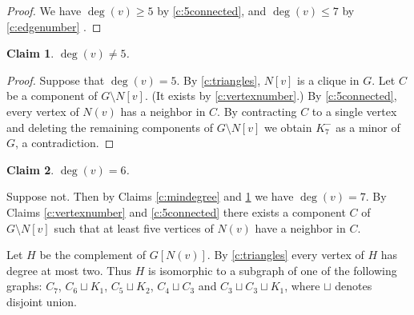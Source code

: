 \documentclass[reqno,final,12pt]{amsart}
\newtheorem{claim}{Claim}[section]
\begin{document}
{\begin{proof}
We have	$\deg(v) \geq 5$ by \cref{c:5connected}, and $\deg(v) \leq 7$ by \cref{c:edgenumber} .
\end{proof}

 \begin{claim}\label{c:degree5}  $ \deg(v) \neq 5$.  
 \end{claim}	
 
\begin{proof}	
 Suppose that $\deg(v)=5$.
 By \cref{c:triangles},  $N[v]$ is a clique in $G$. Let $C$ be a component of $G \setminus N[v]$.  (It exists by \cref{c:vertexnumber}.)	 By \cref{c:5connected}, every vertex of $N(v)$ has a neighbor in $C$. By contracting $C$ to a single vertex and deleting the remaining components of  $G \setminus N[v]$ we obtain $K^-_7$ as a minor of $G$, a contradiction.
\end{proof}	

\begin{claim}\label{c:degree6}  $ \deg(v) = 6$.  
\end{claim}	


 Suppose not. Then by Claims \ref{c:mindegree} and \ref{c:degree5} we have $\deg(v)=7$. By Claims  \ref{c:vertexnumber} and \ref{c:5connected} there exists a component $C$ of $G \setminus N[v]$ such that at least five vertices of $N(v)$ have a neighbor in $C$.
 
 Let $H$ be the complement of $G[N(v)]$. By \cref{c:triangles} every vertex of $H$ has degree at most two. Thus $H$ is isomorphic to a subgraph of one of the following graphs:
 $C_7$, $C_6 \sqcup K_1$, $C_5 \sqcup K_2$, $C_4 \sqcup C_3$ and $C_3 \sqcup C_3 \sqcup K_1$, where $\sqcup$ denotes disjoint union.
 
}
\end{document}
